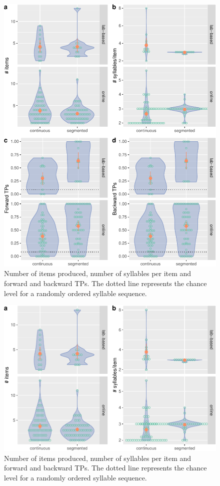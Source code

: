 \documentclass[
]{article}
\begin{document}
\begin{figure}

{\centering \includegraphics[width=0.8\linewidth]{segmentation_recall_combined_for_revision4_files/figure-latex/recall-general-measures-tp-plot-1} 

}

\caption{Number of items produced, number of syllables per item and forward and backward TPs. The dotted line represents the chance level for a randomly ordered syllable sequence.}\label{fig:recall-general-measures-tp-plot}
\end{figure}

\begin{figure}

{\centering \includegraphics[width=0.8\linewidth]{segmentation_recall_combined_for_revision4_files/figure-latex/recall-general-measures-tp-plot-n-items-sylls-1} 

}

\caption{Number of items produced, number of syllables per item and forward and backward TPs. The dotted line represents the chance level for a randomly ordered syllable sequence.}\label{fig:recall-general-measures-tp-plot-n-items-sylls}
\end{figure}
\end{document}

